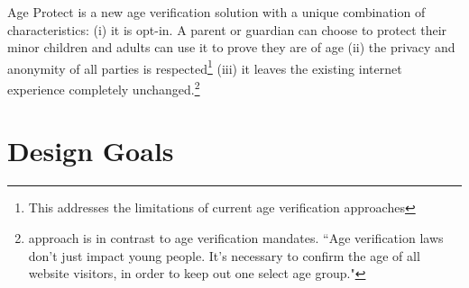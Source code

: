 \documentclass[11pt, oneside]{article}   	%
\begin{document}
Age Protect is a new age verification solution with a unique combination of characteristics: (i) it is opt-in. A parent or guardian can choose to protect their minor children and adults can use it to prove they are of age (ii) the privacy and anonymity of all parties is respected\footnote{This addresses the limitations of current age verification approaches\cite{Roth2023}} (iii) it leaves the existing internet experience completely unchanged.\footnote{ approach is in contrast to age verification mandates. ``Age verification laws don’t just impact young people. It’s necessary to confirm the age of all website visitors, in order to keep out one select age group."\cite{Kelley2023}}

\section{Design Goals}
\end{document}
